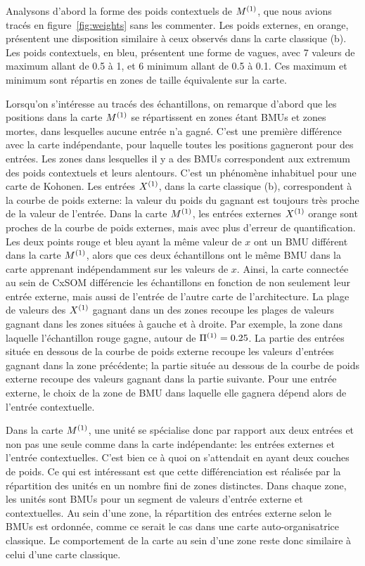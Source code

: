 \documentclass[../main]{subfiles}
\begin{document}
Analysons d'abord la forme des poids contextuels de $M^{({1})}$, que nous avions tracés en figure~\ref{fig:weights} sans les commenter. Les poids externes, en orange, présentent une disposition similaire à ceux observés dans la carte classique (b). Les poids contextuels, en bleu, présentent une forme de vagues, avec 7 valeurs de maximum allant de 0.5 à 1, et 6 minimum allant de 0.5 à 0.1. Ces maximum et minimum sont répartis en zones de taille équivalente sur la carte. 

Lorsqu'on s'intéresse au tracés des échantillons, on remarque d'abord que les positions dans la carte $M^{({1})}$ se répartissent en zones étant BMUs et zones mortes, dans lesquelles aucune entrée n'a gagné. C'est une première différence avec la carte indépendante, pour laquelle toutes les positions gagneront pour des entrées. Les zones dans lesquelles il y a des BMUs correspondent aux extremum des poids contextuels et leurs alentours. C'est un phénomène inhabituel pour une carte de Kohonen. Les entrées $X^{({1})}$, dans la carte classique (b), correspondent à la courbe de poids externe: la valeur du poids du gagnant est toujours très proche de la valeur de l'entrée. Dans la carte $M^{({1})}$, les entrées externes $X^{({1})}$ orange sont proches de la courbe de poids externes, mais avec plus d'erreur de quantification.
Les deux points rouge et bleu ayant la même valeur de $x$ ont un BMU différent dans la carte $M^{({1})}$, alors que ces deux échantillons ont le même BMU dans la carte apprenant indépendamment sur les valeurs de $x$. Ainsi, la carte connectée au sein de CxSOM différencie les échantillons en fonction de non seulement leur entrée externe, mais aussi de l'entrée de l'autre carte de l'architecture. La plage de valeurs des $X^{({1})}$ gagnant dans un des zones recoupe les plages de valeurs gagnant dans les zones situées à gauche et à droite. Par exemple, la zone dans laquelle l'échantillon rouge gagne, autour de $\Pi^{({1})} = 0.25$. La partie des entrées située en dessous de la courbe de poids externe recoupe les valeurs d'entrées gagnant dans la zone précédente; la partie située au dessous de la courbe de poids externe recoupe des valeurs gagnant dans la partie suivante. Pour une entrée externe, le choix de la zone de BMU dans laquelle elle gagnera dépend alors de l'entrée contextuelle. 


Dans la carte $M^{({1})}$, une unité se spécialise donc par rapport aux deux entrées et non pas une seule comme dans la carte indépendante: les entrées externes et l'entrée contextuelles. C'est bien ce à quoi on s'attendait en ayant deux couches de poids. Ce qui est intéressant est que cette différenciation est réalisée par la répartition des unités en un nombre fini de zones distinctes. Dans chaque zone, les unités sont BMUs pour un segment de valeurs d'entrée externe et contextuelles. Au sein d'une zone, la répartition des entrées externe selon le BMUs est ordonnée, comme ce serait le cas dans une carte auto-organisatrice classique. Le comportement de la carte au sein d'une zone reste donc similaire à celui d'une carte classique.
\end{document}
